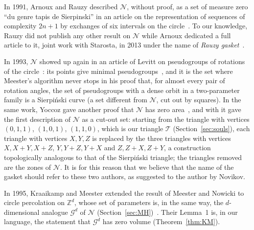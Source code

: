 \documentclass[11pt]{amsart}
\theoremstyle{definition}
\theoremstyle{remark}
\newcommand{\Z}{\mathbb Z}
\newcommand{\cN}{\mathcal N}
\newcommand{\cT}{\mathcal T}
\begin{document}
In 1991, Arnoux and Rauzy described $\cN$, without proof, as a set of measure zero ``du genre tapis de Sierpinski'' in an article on the representation of sequences of complexity $2n+1$ by exchanges of six intervals on the circle~\cite[\S4]{AR91}.
To our knowledge, Rauzy did not publish any other result on $\cN$ while Arnoux dedicated a full article to it, joint work with Starosta, in 2013 under the name of {\em Rauzy gasket}~\cite{AS13}.

In 1993, $\cN$ showed up again in an article of Levitt on pseudogroups of rotations of the circle~\cite{Lev93}: its points give minimal pseudogroups~\cite[Remarque~V.10]{Lev93}, and it is the set where Meester's algorithm never stops in his proof that, for almost every pair of rotation angles, the set of pseudogroups with a dense orbit in a two-parameter family is a Sierpi\'nski curve (a set different from $\cN$, cut out by squares).
In the same work, Yoccoz gave another proof that $\cN$ has zero area~\cite[Lemme~V.9]{Lev93}, and with it gave the first description of $\cN$ as a cut-out set: starting from the triangle with vertices $(0,1,1)$, $(1,0,1)$, $(1,1,0)$, which is our triangle $\cT$ (Section~\ref{sec:souls}), each triangle with vertices $X,Y,Z$ is replaced by the three triangles with vertices $X,X+Y,X+Z$, $Y,Y+Z,Y+X$ and $Z,Z+X,Z+Y$, a construction topologically analogous to that of the Sierpi\'nski triangle; the triangles removed are the zones of $\cN$.
It is for this reason that we believe that the name of the gasket should refer to these two authors, as suggested to the author by Novikov.

In 1995, Kraaikamp and Meester extended the result of Meester and Nowicki to circle percolation on $\Z^d$, whose set of parameters is, in the same way, the $d$-dimensional analogue $\mathcal G^d$ of $\cN$ (Section~\ref{sec:MH})~\cite{KM95}.
Their Lemma~1 is, in our language, the statement that $\mathcal G^d$ has zero volume (Theorem~\ref{thm:KM}).
\end{document}
